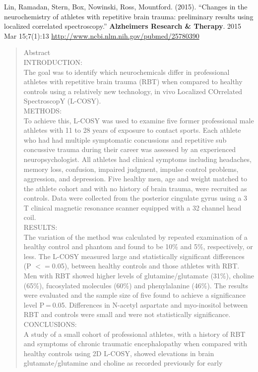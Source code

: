 \begin{enumerate}
Lin, Ramadan, Stern, Box, Nowinski, Ross, Mountford. (2015).
``Changes in the neurochemistry of athletes with repetitive brain trauma: preliminary results using localized correlated spectroscopy.''
{\bf Alzheimers Research \& Therapy}. 2015 Mar 15;7(1):13
\url{http://www.ncbi.nlm.nih.gov/pubmed/25780390}
{\footnotesize
\begin{quotation}
  Abstract\\
INTRODUCTION:\\
The goal was to identify which neurochemicals differ in professional
athletes with repetitive brain trauma (RBT) when compared to healthy
controls using a relatively new technology, in vivo Localized
COrrelated SpectroscopY (L-COSY).\\ 
METHODS:\\
To achieve this, L-COSY was used to examine five former professional
male athletes with 11 to 28 years of exposure to contact sports. Each
athlete who had had multiple symptomatic concussions and repetitive
sub concussive trauma during their career was assessed by an
experienced neuropsychologist. All athletes had clinical symptoms
including headaches, memory loss, confusion, impaired judgment,
impulse control problems, aggression, and depression. Five healthy
men, age and weight matched to the athlete cohort and with no history
of brain trauma, were recruited as controls. Data were collected from
the posterior cingulate gyrus using a 3 T clinical magnetic resonance
scanner equipped with a 32 channel head  coil.\\
RESULTS:\\
The variation of the method was calculated by repeated examination of
a healthy control and phantom and found to be 10\% and 5\%,
respectively, or less. The L-COSY measured large and statistically
significant differences (P $<=$0.05), between healthy controls and
those athletes with RBT. Men with RBT showed higher levels of
glutamine/glutamate (31\%), choline (65\%), fucosylated molecules
(60\%) and phenylalanine (46\%). The results were evaluated and the
sample size of five found to achieve a significance level P = 0.05.  Differences in N-acetyl aspartate and myo-inositol
between RBT and controls were small and were not statistically
significance.\\ 
CONCLUSIONS:\\
A study of a small cohort of professional athletes, with a history of
RBT and symptoms of chronic traumatic encephalopathy when compared
with healthy controls using 2D L-COSY, showed elevations in brain
glutamate/glutamine and choline as recorded previously for early

\end{quotation}}
\end{enumerate}
